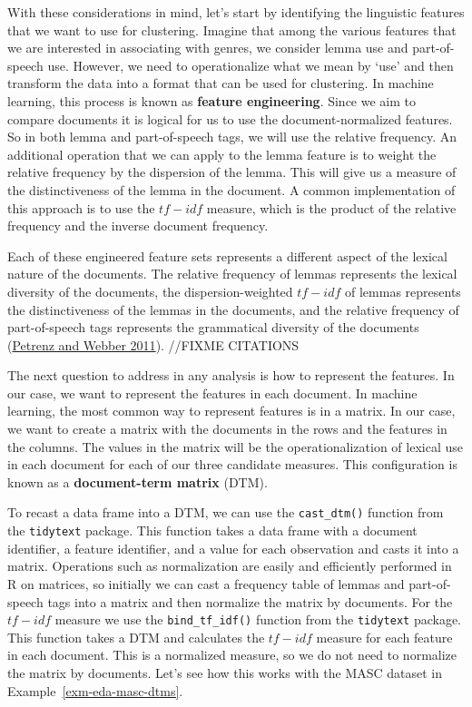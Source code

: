 \documentclass[
  letterpaper,
  DIV=11,
  numbers=noendperiod]{scrreport}
\theoremstyle{definition}
\theoremstyle{remark}
\begin{document}
With these considerations in mind, let's start by identifying the
linguistic features that we want to use for clustering. Imagine that
among the various features that we are interested in associating with
genres, we consider lemma use and part-of-speech use. However, we need
to operationalize what we mean by `use' and then transform the data into
a format that can be used for clustering. In machine learning, this
process is known as \textbf{feature engineering}. Since we aim to
compare documents it is logical for us to use the document-normalized
features. So in both lemma and part-of-speech tags, we will use the
relative frequency. An additional operation that we can apply to the
lemma feature is to weight the relative frequency by the dispersion of
the lemma. This will give us a measure of the distinctiveness of the
lemma in the document. A common implementation of this approach is to
use the \(tf-idf\) measure, which is the product of the relative
frequency and the inverse document frequency.

Each of these engineered feature sets represents a different aspect of
the lexical nature of the documents. The relative frequency of lemmas
represents the lexical diversity of the documents, the
dispersion-weighted \(tf-idf\) of lemmas represents the distinctiveness
of the lemmas in the documents, and the relative frequency of
part-of-speech tags represents the grammatical diversity of the
documents (\protect\hyperlink{ref-Petrenz2011}{Petrenz and Webber
2011}). //FIXME CITATIONS

The next question to address in any analysis is how to represent the
features. In our case, we want to represent the features in each
document. In machine learning, the most common way to represent features
is in a matrix. In our case, we want to create a matrix with the
documents in the rows and the features in the columns. The values in the
matrix will be the operationalization of lexical use in each document
for each of our three candidate measures. This configuration is known as
a \textbf{document-term matrix} (DTM).

To recast a data frame into a DTM, we can use the \texttt{cast\_dtm()}
function from the \texttt{tidytext} package. This function takes a data
frame with a document identifier, a feature identifier, and a value for
each observation and casts it into a matrix. Operations such as
normalization are easily and efficiently performed in R on matrices, so
initially we can cast a frequency table of lemmas and part-of-speech
tags into a matrix and then normalize the matrix by documents. For the
\(tf-idf\) measure we use the \texttt{bind\_tf\_idf()} function from the
\texttt{tidytext} package. This function takes a DTM and calculates the
\(tf-idf\) measure for each feature in each document. This is a
normalized measure, so we do not need to normalize the matrix by
documents. Let's see how this works with the MASC dataset in
Example~\ref{exm-eda-masc-dtms}.
\end{document}
